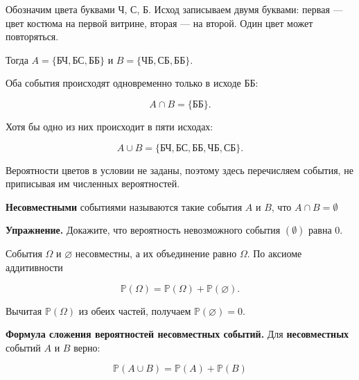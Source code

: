 \begin{solution}\label{solution-addition-of-probabilities-theory-example}
Обозначим цвета буквами Ч, С, Б. Исход записываем двумя буквами: первая — цвет костюма на первой витрине, вторая — на второй. Один цвет может повторяться.

Тогда $A=\{\text{БЧ},\text{БС},\text{ББ}\}$ и $B=\{\text{ЧБ},\text{СБ},\text{ББ}\}$.

Оба события происходят одновременно только в исходе ББ:

\[A\cap B=\{\text{ББ}\}.\]

Хотя бы одно из них происходит в пяти исходах:

\[A\cup B=\{\text{БЧ},\text{БС},\text{ББ},\text{ЧБ},\text{СБ}\}.\]

Вероятности цветов в условии не заданы, поэтому здесь перечисляем события, не приписывая им численных вероятностей.
\end{solution}

\begin{definition}
\textbf{Несовместными} событиями называются такие события $A$ и $B$, что $A\cap B = \emptyset$
\end{definition}

\begin{example}\label{task-exercise}
\textbf{Упражнение.} Докажите, что вероятность невозможного события $(\emptyset)$ равна $0$.
\end{example}

\begin{solution}\label{solution-addition-of-probabilities-theory-exercise}
События $\Omega$ и $\varnothing$ несовместны, а их объединение равно $\Omega$. По аксиоме аддитивности

\[\mathbb P(\Omega)=\mathbb P(\Omega)+\mathbb P(\varnothing).\]

Вычитая $\mathbb P(\Omega)$ из обеих частей, получаем $\mathbb P(\varnothing)=0$.
\end{solution}

\begin{theorem}\label{theorem-2}
\textbf{Формула сложения вероятностей несовместных событий.} Для \textbf{несовместных} событий $A$ и $B$ верно:

\[\mathbb{P}(A\cup B) = \mathbb{P}(A) + \mathbb{P}(B)\]
\end{theorem}

